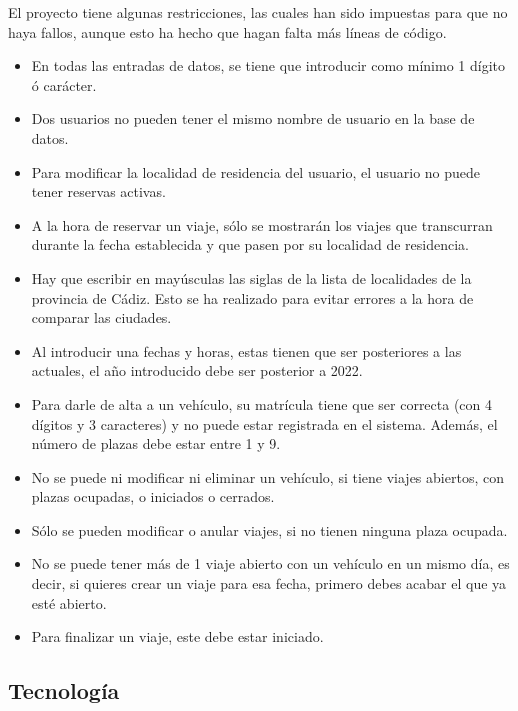 El proyecto tiene algunas restricciones, las cuales han sido impuestas para que no haya fallos, aunque esto ha hecho que hagan falta más líneas de código.
\begin{itemize}
  \item En todas las entradas de datos, se tiene que introducir como mínimo 1 dígito ó carácter.
  \item Dos usuarios no pueden tener el mismo nombre de usuario en la base de datos.
  \item Para modificar la localidad de residencia del usuario, el usuario no puede tener reservas activas.
  \item A la hora de reservar un viaje, sólo se mostrarán los viajes que transcurran durante la fecha establecida y que pasen por su localidad de residencia.
  \item Hay que escribir en mayúsculas las siglas de la lista de localidades de la provincia de Cádiz. Esto se ha realizado para evitar errores a la hora de comparar las ciudades.
  \item Al introducir una fechas y horas, estas tienen que ser posteriores a las actuales, el año introducido debe ser posterior a 2022.
  \item Para darle de alta a un vehículo, su matrícula tiene que ser correcta (con 4 dígitos y 3 caracteres) y no puede estar registrada en el sistema. Además, el número de plazas debe estar entre 1 y 9.
  \item No se puede ni modificar ni eliminar un vehículo, si tiene viajes abiertos, con plazas ocupadas, o iniciados o cerrados.
  \item Sólo se pueden modificar o anular viajes, si no tienen ninguna plaza ocupada.
  \item No se puede tener más de 1 viaje abierto con un vehículo en un mismo día, es decir, si quieres crear un viaje para esa fecha, primero debes acabar el que ya esté abierto.
  \item Para finalizar un viaje, este debe estar iniciado.
\end{itemize}
\label{fig:Limitaciones}

\subsection{Tecnología}

